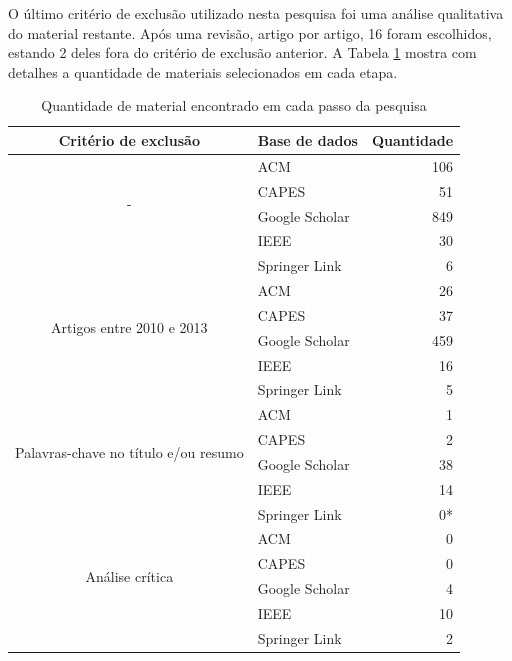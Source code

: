 			O último critério de exclusão utilizado nesta pesquisa foi uma análise qualitativa do material restante. Após uma revisão, artigo por artigo, 16 foram escolhidos, estando 2 deles fora do critério de exclusão anterior. A Tabela  \ref{tab:quantidadeDeMateriais} mostra com detalhes a quantidade de materiais selecionados em cada etapa.
			\begin{table}[H]
				\centering
				\begin{tabular}{| c | l | r |} \hline \textbf{Critério de exclusão} & \textbf{Base de dados}  & \textbf{Quantidade} \\ \hline
					\multirow{4}{*}{-}
						& ACM & 106 \\ \cline{2-3}
						& CAPES & 51 \\ \cline{2-3}
						& Google Scholar & 849 \\ \cline{2-3}
						& IEEE & 30 \\ \cline{2-3}
						& Springer Link & 6 \\ \cline{2-3}
					\hline \hline
					\multirow{4}{*}{Artigos entre 2010 e 2013} 
						& ACM & 26 \\ \cline{2-3}
						& CAPES & 37 \\ \cline{2-3}
						& Google Scholar & 459 \\ \cline{2-3}
						& IEEE & 16 \\ \cline{2-3}
						& Springer Link & 5 \\ \cline{2-3}
					\hline \hline
					\multirow{4}{*}{Palavras-chave no título e/ou resumo} 
						& ACM & 1 \\ \cline{2-3}
						& CAPES & 2 \\ \cline{2-3}
						& Google Scholar & 38 \\ \cline{2-3}
						& IEEE & 14 \\ \cline{2-3}
						& Springer Link & 0* \\ \cline{2-3}
					\hline \hline
					\multirow{4}{*}{Análise crítica}
						& ACM & 0 \\ \cline{2-3}
						& CAPES & 0 \\ \cline{2-3}
						& Google Scholar & 4 \\ \cline{2-3}
						& IEEE & 10 \\ \cline{2-3}
						& Springer Link & 2 \\ \cline{2-3}
					\hline
				\end{tabular}
				\caption{Quantidade de material encontrado em cada passo da pesquisa}
				\label{tab:quantidadeDeMateriais}
			\end{table}
		
